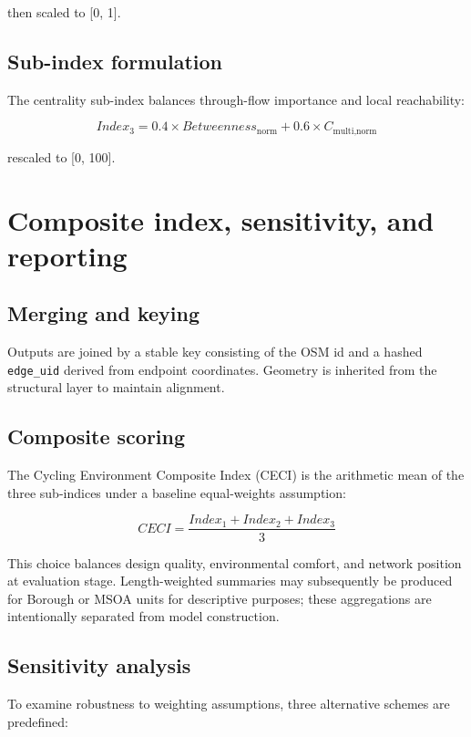 \documentclass[
  12pt,
  oneside]{book}
\begin{document}
then scaled to {[}0, 1{]}.

\subsection{Sub-index formulation}\label{sub-index-formulation-1}

The centrality sub-index balances through-flow importance and local reachability:

\[Index_{3} = 0.4 \times Betweenness_{\text{norm}} + 0.6 \times C_{\text{multi,norm}}\]

rescaled to {[}0, 100{]}.

\section{Composite index, sensitivity, and reporting}\label{composite-index-sensitivity-and-reporting}

\subsection{Merging and keying}\label{merging-and-keying}

Outputs are joined by a stable key consisting of the OSM id and a hashed \texttt{edge\_uid} derived from endpoint coordinates. Geometry is inherited from the structural layer to maintain alignment.

\subsection{Composite scoring}\label{composite-scoring}

The Cycling Environment Composite Index (CECI) is the arithmetic mean of the three sub-indices under a baseline equal-weights assumption:

\[CECI = \frac{Index_{1} + Index_{2} + Index_{3}}{3}\]

This choice balances design quality, environmental comfort, and network position at evaluation stage. Length-weighted summaries may subsequently be produced for Borough or MSOA units for descriptive purposes; these aggregations are intentionally separated from model construction.

\subsection{Sensitivity analysis}\label{sensitivity-analysis}

To examine robustness to weighting assumptions, three alternative schemes are predefined:
\end{document}
